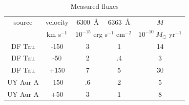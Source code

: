 \documentclass[twocolumn]{aastex62}
\begin{document}

\begin{table}
\caption{Measured fluxes\label{tab:flux}}
\begin{center}
\begin{tabular}{ccccc}
\hline\hline
source & velocity & 6300~\AA{} & 6363~\AA{} & $\dot M$\\ 
       & km s$^{-1}$ & \multicolumn{2}{c}{$10^{-15}$ erg s$^{-1}$ cm$^{-2}$} &
$10^{-10}\;M_{\odot}$ yr$^{-1}$\\
\hline
DF Tau & -150 & 3 & 1 &  14\\
DF Tau & -50 & 2 & .4 & 3\\
DF Tau & +150 & 7 & 5 & 30\\
UY Aur A & -150 & .6 & 2 & 5\\
UY Aur A & +50 & 3 & 1 & 8\\
\end{tabular}
\end{center}
\end{table}
\end{document}
